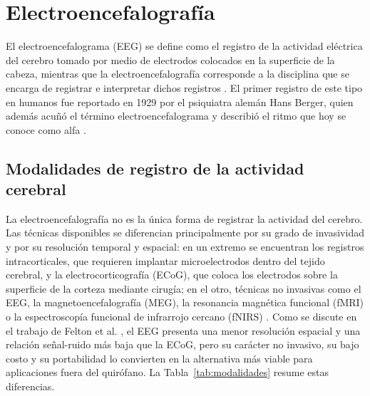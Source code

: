 \section[ELECTROENCEFALOGRAFÍA]{Electroencefalografía}
\label{sec:eeg}

El electroencefalograma (EEG) se define como el registro de la actividad eléctrica del cerebro
tomado por medio de electrodos colocados en la superficie de la cabeza, mientras que la
electroencefalografía corresponde a la disciplina que se encarga de registrar e interpretar dichos
registros \cite{kane2017}. El primer registro de este tipo en humanos fue reportado en 1929 por el
psiquiatra alemán Hans Berger, quien además acuñó el término electroencefalograma y describió el
ritmo que hoy se conoce como alfa \cite{berger1929}.

\subsection{Modalidades de registro de la actividad cerebral}

La electroencefalografía no es la única forma de registrar la actividad del cerebro. Las técnicas
disponibles se diferencian principalmente por su grado de invasividad y por su resolución
temporal y espacial: en un extremo se encuentran los registros intracorticales, que requieren
implantar microelectrodos dentro del tejido cerebral, y la electrocorticografía (ECoG), que coloca
los electrodos sobre la superficie de la corteza mediante cirugía; en el otro, técnicas no
invasivas como el EEG, la magnetoencefalografía (MEG), la resonancia magnética funcional (fMRI) o la
espectroscopía funcional de infrarrojo cercano (fNIRS) \cite{nicolasalonso2012}. Como se discute
en el trabajo de Felton et al. \cite{felton2007}, el EEG presenta una menor resolución espacial y
una relación señal-ruido más baja que la ECoG, pero su carácter no invasivo, su bajo costo y su
portabilidad lo convierten en la alternativa más viable para aplicaciones fuera del quirófano. La
Tabla~\ref{tab:modalidades} resume estas diferencias.

